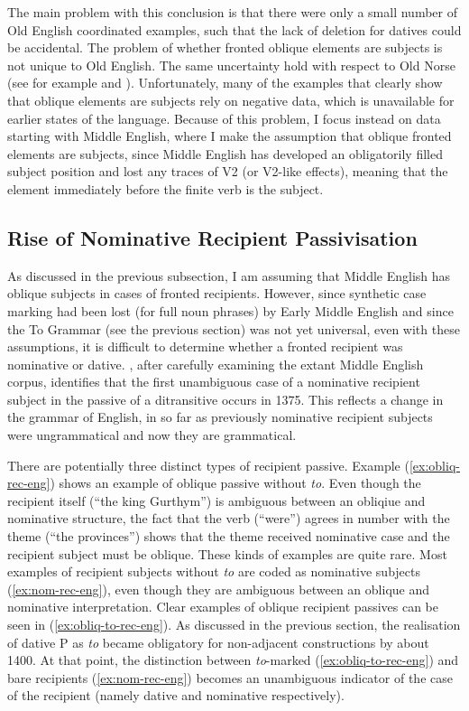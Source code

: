 	The main problem with this conclusion is that there were only a small number of Old English coordinated examples, such that the lack of deletion for datives could be accidental. The problem of whether fronted oblique elements are subjects is not unique to Old English. The same uncertainty hold with respect to Old Norse (see for example \citealt{Kristoffersen.1991,Kristoffersen.1994} and \citealt{Bardal.2001b}). Unfortunately, many of the examples that clearly show that oblique elements are subjects rely on negative data, which is unavailable for earlier states of the language. Because of this problem, I focus instead on data starting with Middle English, where I make the assumption that oblique fronted elements are subjects, since Middle English has developed an obligatorily filled subject position and lost any traces of V2 (or V2-like effects), meaning that the element immediately before the finite verb is the subject.

	\subsection{Rise of Nominative Recipient Passivisation}

	As discussed in the previous subsection, I am assuming that Middle English has oblique subjects in cases of fronted recipients. However, since synthetic case marking had been lost (for full noun phrases) by Early Middle English and since the To Grammar (see the previous section) was not yet universal, even with these assumptions, it is difficult to determine whether a fronted recipient was nominative or dative. \cite{Allen.1999}, after carefully examining the extant Middle English corpus, identifies that the first unambiguous case of a nominative recipient subject in the passive of a ditransitive occurs in 1375. This reflects a change in the grammar of English, in so far as previously nominative recipient subjects were ungrammatical and now they are grammatical.

	There are potentially three distinct types of recipient passive. Example (\ref{ex:obliq-rec-eng}) shows an example of oblique passive without \textit{to}. Even though the recipient itself (``the king Gurthym'') is ambiguous between an obliqiue and nominative structure, the fact that the verb (``were'') agrees in number with the theme (``the provinces'') shows that the theme received nominative case and the recipient subject must be oblique. These kinds of examples are quite rare. Most examples of recipient subjects without \textit{to} are coded as nominative subjects (\ref{ex:nom-rec-eng}), even though they are ambiguous between an oblique and nominative interpretation. Clear examples of oblique recipient passives can be seen in (\ref{ex:obliq-to-rec-eng}). As discussed in the previous section, the realisation of dative P as \textit{to} became obligatory for non-adjacent constructions by about 1400. At that point, the distinction between \textit{to}-marked (\ref{ex:obliq-to-rec-eng}) and bare recipients (\ref{ex:nom-rec-eng}) becomes an unambiguous indicator of the case of the recipient (namely dative and nominative respectively).


